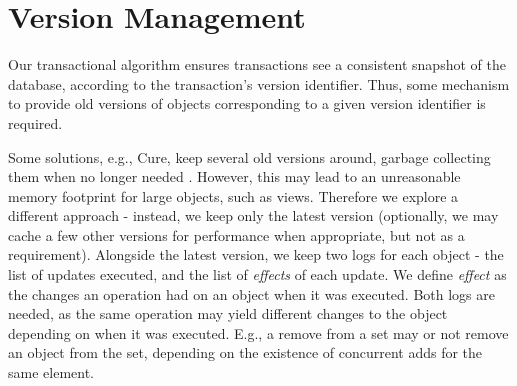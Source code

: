 \section{Version Management}
\label{sec:version_management}

Our transactional algorithm ensures transactions see a consistent snapshot of the database, according to the transaction's version identifier.
Thus, some mechanism to provide old versions of objects corresponding to a given version identifier is required.



Some solutions, e.g., Cure, keep several old versions around, garbage collecting them when no longer needed \cite{cure}.
However, this may lead to an unreasonable memory footprint for large objects, such as views.
Therefore we explore a different approach - instead, we keep only the latest version (optionally, we may cache a few other versions for performance when appropriate, but not as a requirement).
Alongside the latest version, we keep two logs for each object - the list of updates executed, and the list of \emph{effects} of each update.
We define \emph{effect} as the changes an operation had on an object when it was executed.
Both logs are needed, as the same operation may yield different changes to the object depending on when it was executed.
E.g., a remove from a set may or not remove an object from the set, depending on the existence of concurrent adds for the same element.


